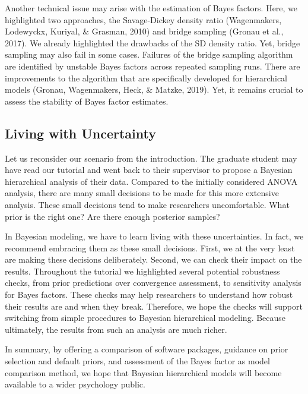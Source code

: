 \documentclass[
  english,
  doc,floatsintext]{apa6}
\begin{document}
Another technical issue may arise with the estimation of Bayes factors. Here, we highlighted two approaches, the Savage-Dickey density ratio (Wagenmakers, Lodewyckx, Kuriyal, \& Grasman, 2010) and bridge sampling (Gronau et al., 2017). We already highlighted the drawbacks of the SD density ratio. Yet, bridge sampling may also fail in some cases. Failures of the bridge sampling algorithm are identified by unstable Bayes factors across repeated sampling runs. There are improvements to the algorithm that are specifically developed for hierarchical models (Gronau, Wagenmakers, Heck, \& Matzke, 2019). Yet, it remains crucial to assess the stability of Bayes factor estimates.

\hypertarget{living-with-uncertainty}{%
\subsection{Living with Uncertainty}\label{living-with-uncertainty}}

Let us reconsider our scenario from the introduction. The graduate student may have read our tutorial and went back to their supervisor to propose a Bayesian hierarchical analysis of their data. Compared to the initially considered ANOVA analysis, there are many small decisions to be made for this more extensive analysis. These small decisions tend to make researchers uncomfortable. What prior is the right one? Are there enough posterior samples?

In Bayesian modeling, we have to learn living with these uncertainties. In fact, we recommend embracing them as these small decisions. First, we at the very least are making these decisions deliberately. Second, we can check their impact on the results. Throughout the tutorial we highlighted several potential robustness checks, from prior predictions over convergence assessment, to sensitivity analysis for Bayes factors. These checks may help researchers to understand how robust their results are and when they break. Therefore, we hope the checks will support switching from simple procedures to Bayesian hierarchical modeling. Because ultimately, the results from such an analysis are much richer.

In summary, by offering a comparison of software packages, guidance on prior selection and default priors, and assessment of the Bayes factor as model comparison method, we hope that Bayesian hierarchical models will become available to a wider psychology public.

\newpage
\end{document}
